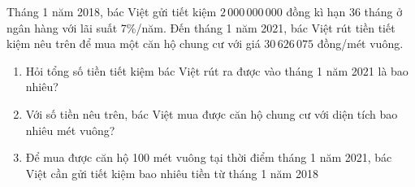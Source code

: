 \viduminhhoa

\begin{vd}
		Tháng 1 năm 2018, bác Việt gửi tiết kiệm $2\,000\,000\,000$ đồng kì hạn 36 tháng ở ngân hàng với lãi suất 7\%/năm. Đến tháng 1 năm 2021, bác Việt rút tiền tiết kiệm nêu trên để mua một căn hộ chung cư với giá $30\,626\,075$ đồng/mét vuông.
		\begin{enumerate}
		\item Hỏi tổng số tiền tiết kiệm bác Việt rút ra được vào tháng 1 năm 2021 là bao nhiêu?
		\item Với số tiền nêu trên, bác Việt mua được căn hộ chung cư với diện tích bao nhiêu mét vuông?
		\item Để mua được căn hộ 100 mét vuông tại thời điểm tháng 1 năm 2021, bác Việt cần gửi tiết kiệm bao nhiêu tiền từ tháng 1 năm 2018
		\end{enumerate}
	\end{vd}
	

